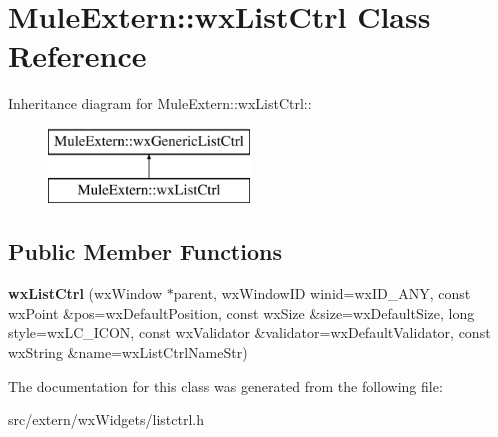 \section{MuleExtern::wxListCtrl Class Reference}
\label{classMuleExtern_1_1wxListCtrl}
Inheritance diagram for MuleExtern::wxListCtrl::\begin{figure}[H]
\begin{center}
\leavevmode
\includegraphics[height=2cm]{classMuleExtern_1_1wxListCtrl}
\end{center}
\end{figure}
\subsection*{Public Member Functions}
\begin{DoxyCompactItemize}
\item 
{\bfseries wxListCtrl} (wxWindow $\ast$parent, wxWindowID winid=wxID\_\-ANY, const wxPoint \&pos=wxDefaultPosition, const wxSize \&size=wxDefaultSize, long style=wxLC\_\-ICON, const wxValidator \&validator=wxDefaultValidator, const wxString \&name=wxListCtrlNameStr)\label{classMuleExtern_1_1wxListCtrl_ae2a1bd676b63e58af00a5acff98bc73f}

\end{DoxyCompactItemize}


The documentation for this class was generated from the following file:\begin{DoxyCompactItemize}
\item 
src/extern/wxWidgets/listctrl.h\end{DoxyCompactItemize}
